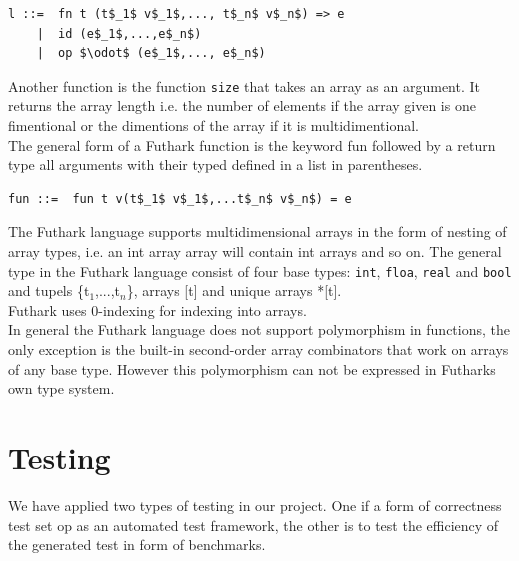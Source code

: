\documentclass[11pt]{article}
\begin{document}
\begin{lstlisting}[numbers=none,frame=none]
l ::=  fn t (t$_1$ v$_1$,..., t$_n$ v$_n$) => e
    |  id (e$_1$,...,e$_n$)
    |  op $\odot$ (e$_1$,..., e$_n$)
\end{lstlisting}


Another function is the function {\tt size} that takes an array as an argument. It returns the array length i.e. the number of elements if the array given is one fimentional or the dimentions of the array if it is multidimentional. \\

The general form of a Futhark function is the keyword fun followed by a return type all arguments 
with their typed defined in a list in parentheses.
\begin{lstlisting}[numbers=none,frame=none]
fun ::=  fun t v(t$_1$ v$_1$,...t$_n$ v$_n$) = e
\end{lstlisting}


The Futhark language supports multidimensional arrays in the form of nesting of array types,
i.e. an int array array will contain int arrays and so on.
The general type in the Futhark language consist of four base types: {\tt int}, {\tt floa}, {\tt real} and {\tt bool} and tupels \{t$_1$,...,t$_n$\}, arrays [t] and unique arrays *[t].\\

Futhark uses 0-indexing for indexing into arrays.\\ %

In general the Futhark language does not support polymorphism in functions,
the only exception is the built-in second-order array combinators that work on arrays of any base type. 
However this polymorphism can not be expressed in Futharks own type system. 






\section{Testing}
We have applied two types of testing in our project. One if a form of correctness test set op as an automated test
framework, the other is to test the efficiency of the generated test in form of benchmarks. 
\end{document}
